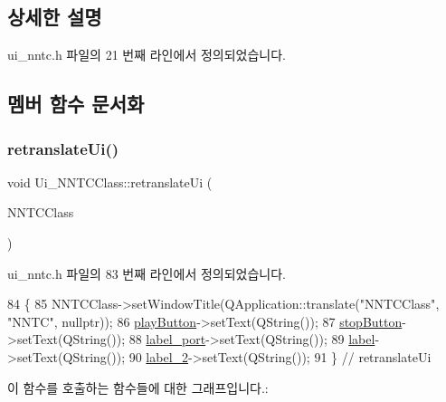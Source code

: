 \subsection{상세한 설명}


ui\+\_\+nntc.\+h 파일의 21 번째 라인에서 정의되었습니다.



\subsection{멤버 함수 문서화}
\mbox{\label{class_ui___n_n_t_c_class_ad2695a3333b66339fde691ec8384d154}} 
\subsubsection{\texorpdfstring{retranslate\+Ui()}{retranslateUi()}}
{\footnotesize\ttfamily void Ui\+\_\+\+N\+N\+T\+C\+Class\+::retranslate\+Ui (\begin{DoxyParamCaption}\item[{Q\+Dialog $\ast$}]{N\+N\+T\+C\+Class }\end{DoxyParamCaption})\hspace{0.3cm}{\ttfamily [inline]}}



ui\+\_\+nntc.\+h 파일의 83 번째 라인에서 정의되었습니다.


\begin{DoxyCode}
84     \{
85         NNTCClass->setWindowTitle(QApplication::translate(\textcolor{stringliteral}{"NNTCClass"}, \textcolor{stringliteral}{"NNTC"}, \textcolor{keyword}{nullptr}));
86         \mbox{\hyperlink{class_ui___n_n_t_c_class_a6e604f467f5d7264f8d23f0cf54a6fdf}{playButton}}->setText(QString());
87         \mbox{\hyperlink{class_ui___n_n_t_c_class_a748e190a62458531e66a574cc556e32d}{stopButton}}->setText(QString());
88         \mbox{\hyperlink{class_ui___n_n_t_c_class_a81085bd25c14084fdec83b6527ad7a4c}{label\_port}}->setText(QString());
89         \mbox{\hyperlink{class_ui___n_n_t_c_class_a4bb97de507bbb57b6d45f102b06a868f}{label}}->setText(QString());
90         \mbox{\hyperlink{class_ui___n_n_t_c_class_ae5ebb132466c86f325d6030871f57b5c}{label\_2}}->setText(QString());
91     \} \textcolor{comment}{// retranslateUi}
\end{DoxyCode}
이 함수를 호출하는 함수들에 대한 그래프입니다.\+:
\mbox{\label{class_ui___n_n_t_c_class_af15085afc5bdbefb529321782b509792}} 

